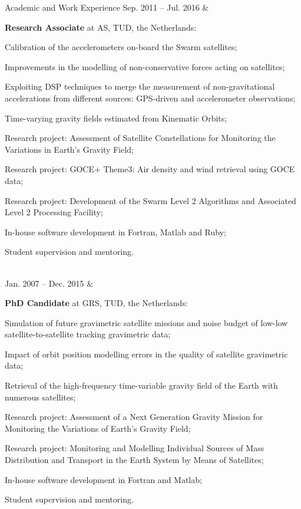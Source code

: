 \documentclass[a4paper,12pt]{article}
\begin{document}
\begin{cvsection}{Academic and Work Experience}
Sep. 2011 -- Jul. 2016 &
  \begin{itti}
    \item \textbf{Research Associate} at \ac{AS}, \ac{TUD}, the Netherlands:
    \begin{ittib}
      \item Calibration of the accelerometers on-board the Swarm satellites;
      \item Improvements in the modelling of non-conservative forces acting on satellites;
      \item Exploiting \acf{DSP} techniques to merge the measurement of non-gravitational accelerations from different sources: \acf{GPS}-driven and accelerometer observations;
      \item Time-varying gravity fields estimated from Kinematic Orbits;
      \item Research project: Assessment of Satellite Constellations for Monitoring the Variations in Earth's Gravity Field;
      \item Research project: GOCE+ Theme3: Air density and wind retrieval using \acf{GOCE} data;
      \item Research project: Development of the Swarm Level 2 Algorithms and Associated Level 2 Processing Facility;
      \item In-house software development in Fortran, Matlab and Ruby;
      \item Student supervision and mentoring.
    \end{ittib}
  \end{itti}\\

Jan. 2007 -- Dec. 2015 &
  \begin{itti}
    \item \textbf{PhD Candidate} at \ac{GRS}, \ac{TUD}, the Netherlands:
    \begin{ittib}
      \item Simulation of future gravimetric satellite missions and noise budget of low-low satellite-to-satellite tracking gravimetric data;
      \item Impact of orbit position modelling errors in the quality of satellite gravimetric data;
      \item Retrieval of the high-frequency time-variable gravity field of the Earth with numerous satellites;
      \item Research project: Assessment of a Next Generation Gravity Mission for Monitoring the Variations of Earth's Gravity Field;
      \item Research project: Monitoring and Modelling Individual Sources of Mass Distribution and Transport in the Earth System by Means of Satellites;
      \item In-house software development in Fortran and Matlab;
      \item Student supervision and mentoring.
    \end{ittib}
  \end{itti}\\



\end{cvsection}
\end{document}

